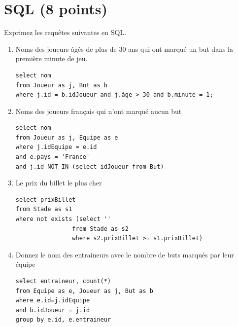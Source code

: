 \section{SQL (8 points)}

Exprimez les requêtes suivantes en SQL.

\begin{enumerate}

\item Noms des joueurs âgés de plus de 30 ans qui ont 
     marqué un but dans la première minute de jeu. 

\begin{solution}
\begin{verbatim}
select nom 
from Joueur as j, But as b
where j.id = b.idJoueur and j.âge > 30 and b.minute = 1;
\end{verbatim}
\end{solution}

\item Noms des joueurs français qui n'ont marqué aucun but

\begin{solution}
\begin{verbatim}
select nom 
from Joueur as j, Equipe as e
where j.idEquipe = e.id 
and e.pays = 'France' 
and j.id NOT IN (select idJoueur from But)
\end{verbatim}
\end{solution}

\item Le prix du billet le plus cher

\begin{solution}

\begin{verbatim}
select prixBillet 
from Stade as s1
where not exists (select ''
                from Stade as s2
                where s2.prixBillet >= s1.prixBillet)
\end{verbatim}
\end{solution}


\item Donnez le nom des entraineurs avec le nombre de buts marqués par leur équipe

\begin{solution}
\begin{verbatim}
select entraineur, count(*)
from Equipe as e, Joueur as j, But as b
where e.id=j.idEquipe
and b.idJoueur = j.id
group by e.id, e.entraineur
\end{verbatim}
\end{solution}




\end{enumerate}
